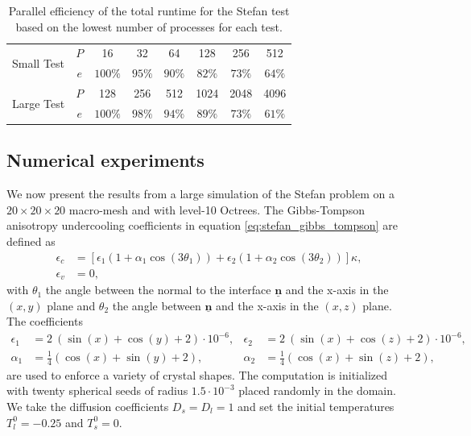 \begin{table}
\centering
	\begin{tabular}{|l|c|cccccc|}
	\hline
	\multirow{2}{*}{Small Test} & $P$ & 16      & 32      & 64      & 128     & 256    & 512 \\ 	                            
	                            & $e$ & $100\%$ & $95\%$  & $90\%$  & $82\%$  & $73\%$ & $64\%$ \\
	\hline
	\multirow{2}{*}{Large Test} & $P$ & 128     & 256     & 512     & 1024    & 2048   & 4096 \\ 	                            
	                            & $e$ & $100\%$ & $98\%$  & $94\%$  & $89\%$  & $73\%$ & $61\%$ \\
	\hline
	\end{tabular}
	\caption{Parallel efficiency of the total runtime for the Stefan test based on the lowest number of processes for each test.}
	\label{tab:scaling_stefan} 
\end{table}

\subsection{Numerical experiments}
We now present the results from a large simulation of the Stefan problem on a $20\times20\times20$ macro-mesh and with level-10 Octrees. The Gibbs-Tompson anisotropy undercooling coefficients in equation \eqref{eq:stefan_gibbs_tompson} are defined as
\begin{align*}
\epsilon_c & = \left[ \epsilon_1 \left( 1+\alpha_1 \cos(3\theta_1) \right) + \epsilon_2 \left( 1+\alpha_2 \cos(3\theta_2) \right) \right] \kappa,\\
\epsilon_v & = 0,
\end{align*}
with $\theta_1$ the angle between the normal to the interface $\underline{\mathbf{n}}$ and the x-axis in the $(x,y)$ plane and $\theta_2$ the angle between $\underline{\mathbf{n}}$ and the x-axis in the $(x,z)$ plane. The coefficients
\begin{align*}
\epsilon_1 & = 2~(\sin(x)+\cos(y)+2)\cdot10^{-6}, & \epsilon_2 & = 2~(\sin(x)+\cos(z)+2)\cdot10^{-6}, \\
\alpha_1 & = \frac{1}{4}(\cos(x)+\sin(y)+2), & \alpha_2 & = \frac{1}{4}(\cos(x)+\sin(z)+2),
\end{align*}
are used to enforce a variety of crystal shapes. The computation is initialized with twenty spherical seeds of radius $1.5 \cdot 10^{-3}$ placed randomly in the domain. We take the diffusion coefficients $D_s=D_l=1$ and set the initial temperatures $T^0_l=-0.25$ and $T^0_s=0$.

